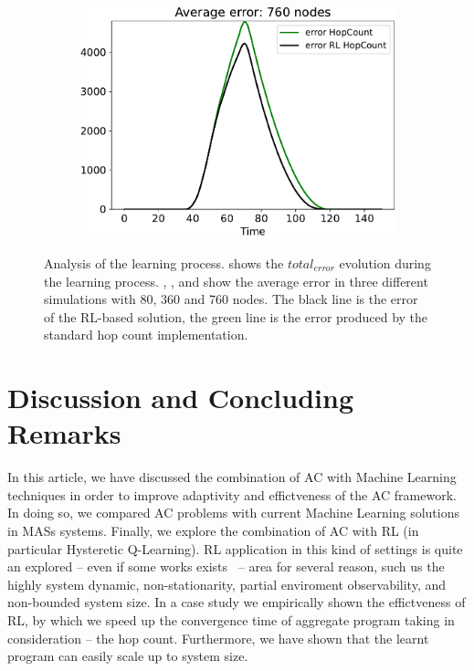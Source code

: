 \documentclass[conference]{IEEEtran}
\newcommand{\todos}[1]{\todo[inline, color=cyan]{\textbf{TODO}: #1}}
\begin{document}
\begin{figure}
\begin{subfigure}[b]{0.3\textwidth}
      \includegraphics[width=\textwidth]{img/760}
      \caption{}
      \label{fig:simulation-d}
  \end{subfigure}
  \caption{Analysis of the learning process.  shows the $total_{error}$ evolution during the learning process. , , and  show the average error in three different simulations with 80, 360 and 760 nodes. 
  The black line is the error of the RL-based solution, 
  the green line is the error produced by the standard hop count implementation.}
  \label{fig:simulation}
\end{figure}

\section{Discussion and Concluding Remarks}\label{conclusion}
In this article, we have discussed the combination of AC with Machine Learning techniques in order to improve adaptivity
 and effictveness of the AC framework.
In doing so, we compared AC problems with current Machine Learning solutions in MASs systems.
%
Finally, we explore the combination of AC with RL (in particular Hysteretic Q-Learning).
RL application in this kind of settings is quite an explored -- even if some works exists~\cite{DBLP:conf/icml/YangLLZZW18} -- 
 area for several reason, such us the highly system dynamic, non-stationarity,  partial enviroment observability, and non-bounded system size.
In a case study we empirically shown the effictveness of RL, by which we speed up the convergence time of
 aggregate program taking in consideration -- the hop count.
Furthermore, we have shown that the learnt program can easily scale up to system size.
\end{document}
